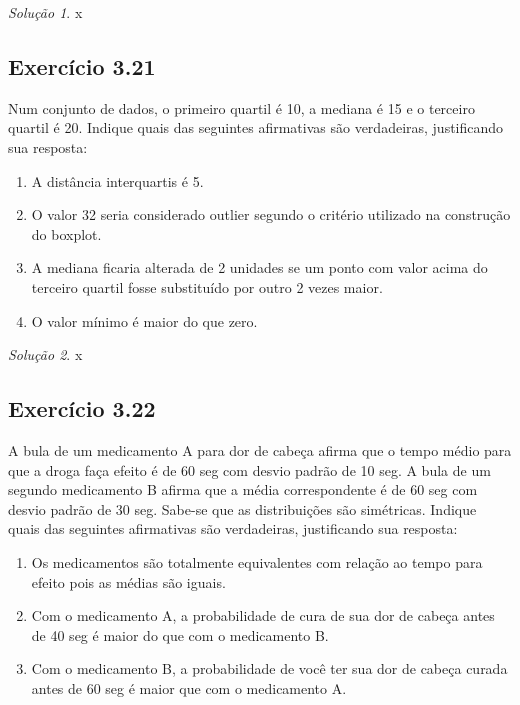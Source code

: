 \documentclass[
]{latex/krantz}
\providecommand{\tightlist}{%
  \setlength{\itemsep}{0pt}\setlength{\parskip}{0pt}}
\theoremstyle{definition}
\theoremstyle{definition}
\theoremstyle{definition}
\theoremstyle{definition}
\theoremstyle{remark}
\newtheorem*{solution}{Solução}
\begin{document}
\begin{solution}
x
\end{solution}

\hypertarget{exr3-21}{%
\subsection*{Exercício 3.21}\label{exr3-21}}

Num conjunto de dados, o primeiro quartil é 10, a mediana é 15 e o terceiro quartil é 20. Indique quais das seguintes afirmativas são verdadeiras, justificando sua resposta:

\begin{enumerate}
\def\labelenumi{\alph{enumi})}
\tightlist
\item
  A distância interquartis é 5.
\item
  O valor 32 seria considerado outlier segundo o critério utilizado na construção do boxplot.
\item
  A mediana ficaria alterada de 2 unidades se um ponto com valor acima do terceiro quartil fosse substituído por outro 2 vezes maior.
\item
  O valor mínimo é maior do que zero.
\end{enumerate}

\begin{solution}
x
\end{solution}

\hypertarget{exr3-22}{%
\subsection*{Exercício 3.22}\label{exr3-22}}

A bula de um medicamento A para dor de cabeça afirma que o tempo médio para que a droga faça efeito é de 60 seg com desvio padrão de 10 seg. A bula de um segundo medicamento B afirma que a média correspondente é de 60 seg com desvio padrão de 30 seg. Sabe-se que as distribuições são simétricas. Indique quais das seguintes afirmativas são verdadeiras, justificando sua resposta:

\begin{enumerate}
\def\labelenumi{\alph{enumi})}
\tightlist
\item
  Os medicamentos são totalmente equivalentes com relação ao tempo para efeito pois as médias são iguais.
\item
  Com o medicamento A, a probabilidade de cura de sua dor de cabeça antes de 40 seg é maior do que com o medicamento B.
\item
  Com o medicamento B, a probabilidade de você ter sua dor de cabeça curada antes de 60 seg é maior que com o medicamento A.
\end{enumerate}
\end{document}
